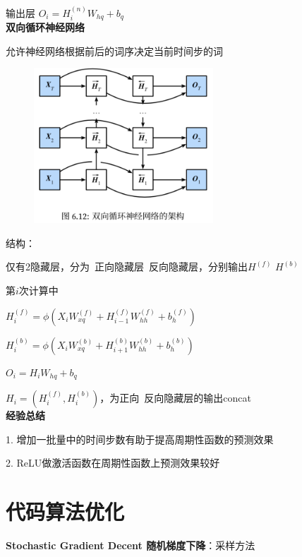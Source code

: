 \documentclass[UTF8]{ctexart}
\begin{document}
  \quad \quad 输出层 $O_i = H_{i}^{(n)}W_{hq} + b_q$\\
\textbf{双向循环神经网络}

  允许神经网络根据前后的词序决定当前时间步的词
  \begin{figure}[H] %
    \centering %
    \includegraphics[width=0.6\textwidth]{note_images/double_deep_RNN.png} %
  \end{figure}
  结构：

  \quad 仅有2隐藏层，分为\ 正向隐藏层\ 反向隐藏层，分别输出$H^{(f)}$ $H^{(b)}$

  \quad 第$i$次计算中

  \quad \quad $H_i^{(f)} = \phi (X_iW_{xq}^{(f)} + H_{i-1}^{(f)}W_{hh}^{(f)} + b_h^{(f)})$

  \quad \quad $H_i^{(b)} = \phi (X_iW_{xq}^{(b)} + H_{i+1}^{(b)}W_{hh}^{(b)} + b_h^{(b)})$

  \quad \quad $O_i = H_iW_{hq} + b_q$

  \quad \quad \quad $H_i = (H_i^{(f)}, H_i^{(b)})$，为正向\ 反向隐藏层的输出concat\\
\textbf{经验总结}

  1. 增加一批量中的时间步数有助于提高周期性函数的预测效果

  2. ReLU做激活函数在周期性函数上预测效果较好


\section{代码算法优化}
\noindent \textbf{Stochastic Gradient Decent 随机梯度下降}：采样方法
\end{document}

